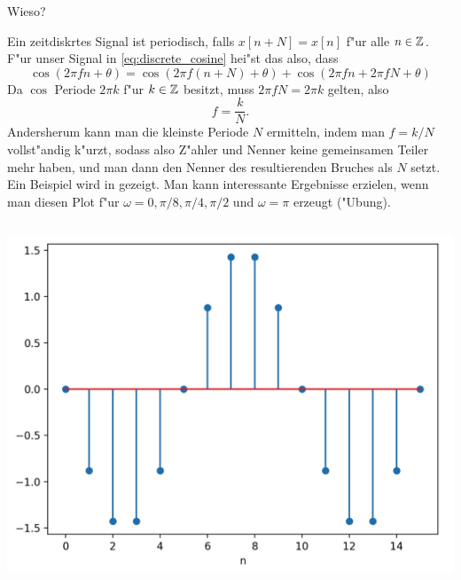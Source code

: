 Wieso?

Ein zeitdiskrtes Signal ist periodisch, falls $x[n + N] = x[n]$ f"ur alle $n \in \mathbb{Z}$.
F"ur unser Signal in \eqref{eq:discrete_cosine} hei"st das also, dass
\[
    \cos(2 \pi f n + \theta) 
        = \cos(2 \pi f (n + N) + \theta)
        + \cos(2 \pi f n + 2 \pi f N + \theta)
\]
Da $\cos$ Periode $2\pi k$ f"ur $k \in \mathbb{Z}$ besitzt, muss $2 \pi f N = 2 \pi k$ gelten, also
\[
    f = \frac kN.
\]
Andersherum kann man die kleinste Periode $N$ ermitteln, indem man $f = k/N$ vollst"andig k"urzt, sodass also Z"ahler und Nenner keine gemeinsamen Teiler mehr haben, und man dann den Nenner des resultierenden Bruches als $N$ setzt. 
Ein Beispiel wird in  gezeigt. 
Man kann interessante Ergebnisse erzielen, wenn man diesen Plot f"ur $\omega=0,\pi/8,\pi/4,\pi/2$ und $\omega=\pi$ erzeugt ("Ubung).
%
\begin{listing}
    \noindent
    \begin{minipage}{0.49\textwidth}
        \strut\vspace*{-\baselineskip}\newline
        \inputminted[firstline=4]{python3}{code/disc_harms.py}
    \end{minipage}%
    \begin{minipage}{0.49\textwidth}
        \strut\vspace*{-\baselineskip}\newline
        \includegraphics[width=\textwidth]{code/disc_harms.png}
    \end{minipage}
    \label{py:disc_harms}
\end{listing}

